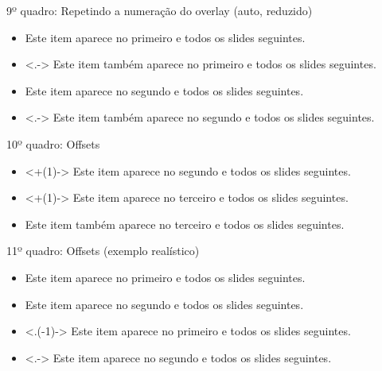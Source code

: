 \documentclass{beamer}
\begin{document}
\begin{frame}{9º quadro: Repetindo a numeração do overlay (auto, reduzido)}
    \begin{itemize}[<+->]
        \item Este item aparece no primeiro e todos os slides seguintes.
        \item<.-> Este item também aparece no primeiro e todos os slides seguintes.
        \item Este item aparece no segundo e todos os slides seguintes.
        \item<.-> Este item também aparece no segundo e todos os slides seguintes.
    \end{itemize}
\end{frame}

\begin{frame}{10º quadro: Offsets}

    \begin{itemize}
        \item<+(1)-> Este item aparece no segundo e todos os slides seguintes.
        \item<+(1)-> Este item aparece no terceiro e todos os slides seguintes.
        \item<+-> Este item também aparece no terceiro e todos os slides seguintes.
    \end{itemize}
\end{frame}

\begin{frame}{11º quadro: Offsets (exemplo realístico)}

    \begin{itemize}
        \item<+-> Este item aparece no primeiro e todos os slides seguintes.
        \item<+-> Este item aparece no segundo e todos os slides seguintes.
        \item<.(-1)-> Este item aparece no primeiro e todos os slides seguintes.
        \item<.-> Este item aparece no segundo e todos os slides seguintes.
    \end{itemize}
\end{frame}
\end{document}
